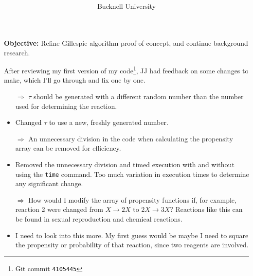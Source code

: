 \documentclass[oneside]{labbook}
\newcommand{\obj}[1]{\textbf{Objective:} #1}
\newcommand{\commit}[1]{\footnote{Git commit \texttt{#1}}}
\begin{document}
\title{
}

\author{
  \\ \\
  Bucknell University
}

\date{}

\maketitle

\printindex
\tableofcontents

\pagestyle{scrheadings}


\obj{Refine Gillespie algorithm proof-of-concept, and continue background research.}

After reviewing my first version of my code\commit{4105445}, JJ had
feedback on some changes to make, which I'll go through and fix one by one.

\begin{itemize}
  \item[$\Rightarrow$] $\tau$ should be generated with a different random number than the number used
  for determining the reaction.
  \item Changed $\tau$ to use a new, freshly generated number.

  \item[$\Rightarrow$] An unnecessary division in the code when calculating the
  propensity array can be removed for efficiency.
  \item Removed the unnecessary division and timed execution with and without
  using the \texttt{time} command. Too much variation in execution times to determine
  any significant change.

  \item[$\Rightarrow$] How would I modify the array of propensity functions if,
  for example, reaction 2 were changed from $X \rightarrow 2X$ to $2X \rightarrow 3X$?
  Reactions like this can be found in sexual reproduction and chemical reactions.
  \item I need to look into this more. My first guess would be maybe I need to
  square the propensity or probability of that reaction, since two reagents are involved.
\end{itemize}
\end{document}
